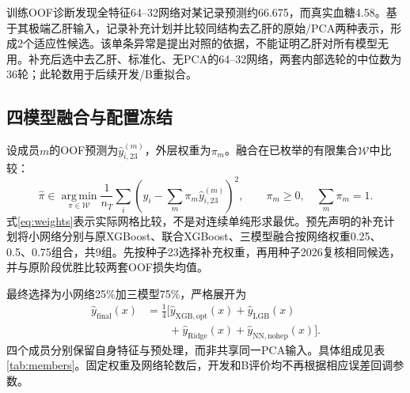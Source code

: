 训练OOF诊断发现全特征64--32网络对某记录预测约66.675，而真实血糖4.58。基于其极端乙肝输入，记录补充计划并比较同结构去乙肝的原始/PCA两种表示，形成2个适应性候选。该单条异常是提出对照的依据，不能证明乙肝对所有模型无用。补充后选中去乙肝、标准化、无PCA的64--32网络，两套内部选轮的中位数为36轮；此轮数用于后续开发/B重拟合。

\subsection{四模型融合与配置冻结}
设成员$m$的OOF预测为$\hat y_{i,23}^{(m)}$，外层权重为$\pi_m$。融合在已枚举的有限集合$\mathcal W$中比较：
\begin{equation}
\widehat\pi\in\operatorname*{arg\,min}_{\pi\in\mathcal W}
\frac1{n_T}\sum_i\left(y_i-\sum_m\pi_m\hat y_{i,23}^{(m)}\right)^2,
\qquad \pi_m\ge0,\quad\sum_m\pi_m=1.
\label{eq:weights}
\end{equation}
式\eqref{eq:weights}表示实际网格比较，不是对连续单纯形求最优。预先声明的补充计划将小网络分别与原XGBoost、联合XGBoost、三模型融合按网络权重0.25、0.5、0.75组合，共9组。先按种子23选择补充权重，再用种子2026复核相同候选，并与原阶段优胜比较两套OOF损失均值。

最终选择为小网络25\%加三模型75\%，严格展开为
\begin{equation}
\begin{aligned}
\hat y_{\mathrm{final}}(x)&=\tfrac14\bigl[\hat y_{\mathrm{XGB,opt}}(x)+\hat y_{\mathrm{LGB}}(x)\\
{}&\qquad+\hat y_{\mathrm{Ridge}}(x)+\hat y_{\mathrm{NN,nohep}}(x)\bigr].
\end{aligned}
\label{eq:final}
\end{equation}
四个成员分别保留自身特征与预处理，而非共享同一PCA输入。具体组成见表\ref{tab:members}。固定权重及网络轮数后，开发和B评价均不再根据相应误差回调参数。

